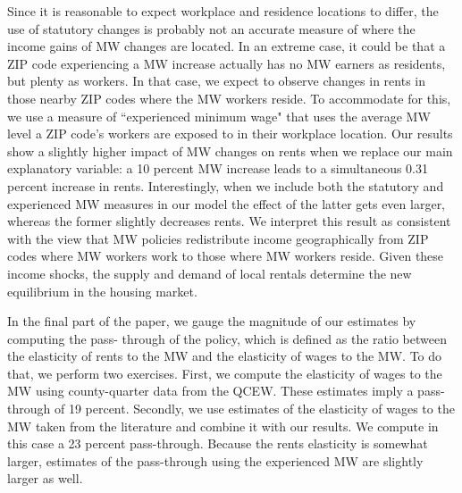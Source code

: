 Since it is reasonable to expect workplace and residence locations to differ, the use of 
statutory changes is probably not an accurate measure of where the income gains of MW changes
are located. In an extreme case, it could be that a ZIP code experiencing a MW increase actually 
has no MW earners as residents, but plenty as workers. In that case, we expect to observe 
changes in rents in those nearby ZIP codes where the MW workers reside. To accommodate for 
this, we use a measure of ``experienced minimum wage" that uses the average MW level 
a ZIP code's workers are exposed to in their workplace location. Our results show a slightly 
higher impact of MW changes on rents when we replace our main explanatory variable: a 10 
percent MW increase leads to a simultaneous 0.31 percent increase in rents. Interestingly, 
when we include both the statutory and experienced MW measures in our model the effect of 
the latter gets even larger, whereas the former slightly decreases rents. We interpret this
result as consistent with the view that MW policies redistribute income geographically from ZIP 
codes where MW workers work to those where MW workers reside.
Given these income shocks, the supply and demand of local rentals 
determine the new equilibrium in the housing market.

In the final part of the paper, we gauge the magnitude of our estimates by computing the pass-
through of the policy, which is defined as the ratio between the elasticity of rents to the MW 
and the elasticity of wages to the MW. To do that, we perform two exercises. First, we compute
the elasticity of wages to the MW using county-quarter data from the QCEW. These estimates
imply a pass-through of 19 percent. Secondly, we use estimates of the elasticity of wages 
to the MW taken from the literature and combine it with our results. We compute in this case a 
23 percent pass-through. Because the rents elasticity is somewhat larger, estimates of the 
pass-through using the experienced MW are slightly larger as well.

